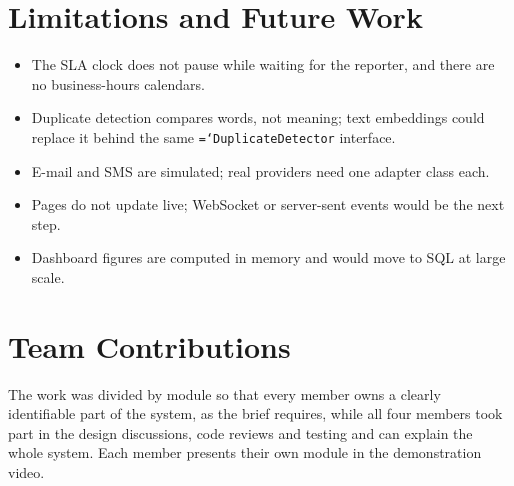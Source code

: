 \documentclass[11pt,a4paper]{article}
\newcommand{\code}[1]{\texttt{\hyphenchar\font=`\-\relax #1}}
\begin{document}
\section{Limitations and Future Work}
\begin{itemize}
  \item The SLA clock does not pause while waiting for the reporter, and there are no business-hours calendars.
  \item Duplicate detection compares words, not meaning; text embeddings could replace it behind the same \code{DuplicateDetector} interface.
  \item E-mail and SMS are simulated; real providers need one adapter class each.
  \item Pages do not update live; WebSocket or server-sent events would be the next step.
  \item Dashboard figures are computed in memory and would move to SQL at large scale.
\end{itemize}

\section{Team Contributions}
The work was divided by module so that every member owns a clearly identifiable part of the system, as the brief requires, while all four members took part in the design discussions, code reviews and testing and can explain the whole system. Each member presents their own module in the demonstration video.
\end{document}
